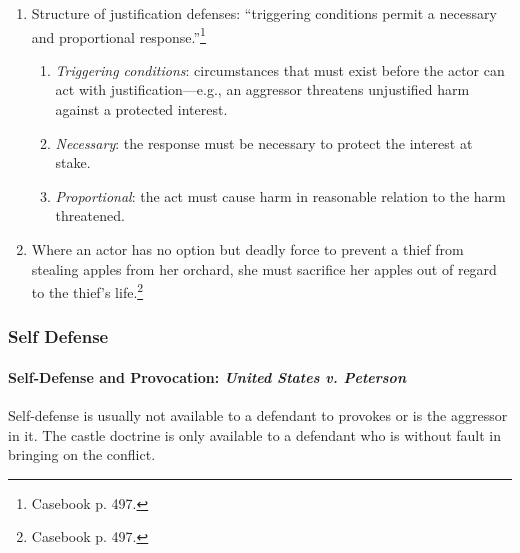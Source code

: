 \begin{enumerate}
    \item Structure of justification defenses: ``triggering conditions permit 
    a necessary and proportional response.''\footnote{Casebook p. 497.}
    \begin{enumerate}
        \item \emph{Triggering conditions}: circumstances that must exist 
        before the actor can act with justification---e.g., an aggressor 
        threatens unjustified harm against a protected interest.
        \item \emph{Necessary}: the response must be necessary to protect the 
        interest at stake.
        \item \emph{Proportional}: the act must cause harm in reasonable 
        relation to the harm threatened.
    \end{enumerate}
    \item Where an actor has no option but deadly force to prevent a thief 
    from stealing apples from her orchard, she must sacrifice her apples out 
    of regard to the thief's life.\footnote{Casebook p. 497.}
\end{enumerate}

\subsubsection{Self Defense}

\paragraph{Self-Defense and Provocation: \emph{United States v. Peterson}}

Self-defense is usually not available to a defendant to provokes or is the 
aggressor in it. The castle doctrine is only available to a defendant who is 
without fault in bringing on the conflict.

